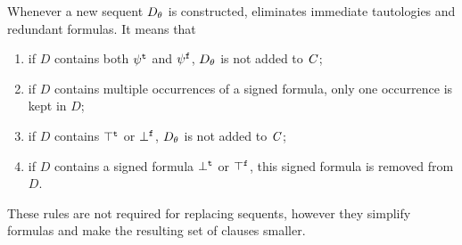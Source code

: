 











Whenever a new sequent ${D}_{\theta}$ is constructed, \newcnf{} eliminates immediate tautologies and redundant formulas. It means that
\begin{enumerate}
  \item if $D$ contains both ${\psi}^{\mathtt{t}}$ and ${\psi}^{\mathtt{f}}$, ${D}_{\theta}$ is not added to $\mathit{C}$;
  \item if $D$ contains multiple occurrences of a signed formula, only one occurrence is kept in $D$;
  \item if $D$ contains ${\top}^{\mathtt{t}}$ or ${\bot}^{\mathtt{f}}$, ${D}_{\theta}$ is not added to $\mathit{C}$;
  \item if $D$ contains a signed formula ${\bot}^{\mathtt{t}}$ or
    ${\top}^{\mathtt{f}}$, this signed formula is removed from $D$.
\end{enumerate}
These rules are not required for replacing sequents, however they simplify formulas and make the resulting set of clauses smaller.

